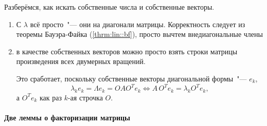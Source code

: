 \documentclass{trlnotes}
\begin{document}
Разберёмся, как искать собственные числа и собственные векторы.
\begin{enumerate}
  \item С $λ$ всё просто~"---  они на диагонали матрицы. Корректность следует
    из теоремы Бауэра-Файка (\ref{thrm:lin::bf}), просто вычтем внедиагональные
    члены
  \item в качестве собственных векторов можно просто взять строки матрицы
    произведения всех двумерных вращений.
    
    Это сработает, поскольку собственные векторы диагональной
    формы~"--- $e_k$,
    \[
      λ_k e_k = Λ e_k = OA O^{T} e_k \iff A\,O^{T}e_k = λ_k O^{T}e_k,
    \]
    а $O^Te_k$ как раз $k$-ая строчка $O$.
\end{enumerate}

\paragraph{Две леммы о факторизации матрицы}
\label{par:lin::factor}
\end{document}
